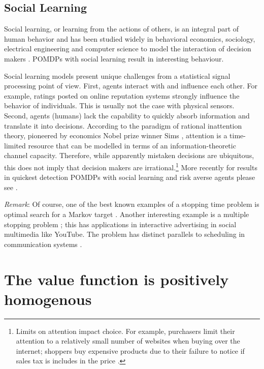 \documentclass[draftcls,onecolumn]{IEEEtran}
\begin{document}
 
 
 \subsection*{Social Learning}
Social learning, or learning from the actions of others, is an integral part of human behavior and has been studied widely  in behavioral economics, sociology, electrical engineering and 
 computer science
  to model the  interaction of  decision makers \cite{BHW92,AO11,Cha04,EK10,Say14b,WD16,Kri12,KP13,KP14}. POMDPs with social learning result in interesting behaviour.

Social learning models  present unique challenges from a statistical signal processing point of view.
First,  agents interact with and influence each other.  For example, ratings posted on online reputation systems strongly influence the behavior of  individuals.
  This is usually not the case with physical sensors.  %
Second,  agents (humans) lack the capability to quickly absorb information  and translate it into decisions.
According to the paradigm of rational inattention theory, pioneered
by economics Nobel prize winner Sims \cite{Sim03},  attention is a time-limited resource that can be modelled in terms of an information-theoretic channel capacity. Therefore, while apparently mistaken decisions are ubiquitous, this does not imply that decision makers are irrational.\footnote{Limits on attention impact choice. For example, purchasers limit their attention to a relatively small
number of websites when buying over the internet; shoppers buy expensive products due to their failure to notice if sales tax is includes in the price  \cite{CD15}.}
  More recently for results in quickest detection POMDPs with social learning and risk averse agents
 please see \cite{Kri12,KB16}.


{\em Remark}: Of course, one of the best known examples of a stopping time problem is optimal search for a Markov target \cite{Eag84,MJ95,SK02,JK06}.
Another interesting example is a multiple stopping problem \cite{Nak95,KAB16}; this has applications in interactive advertising in social multimedia like YouTube. The problem has distinct parallels to scheduling in communication
systems \cite{NK09}.


\section{The value function is positively homogenous}
\end{document}
